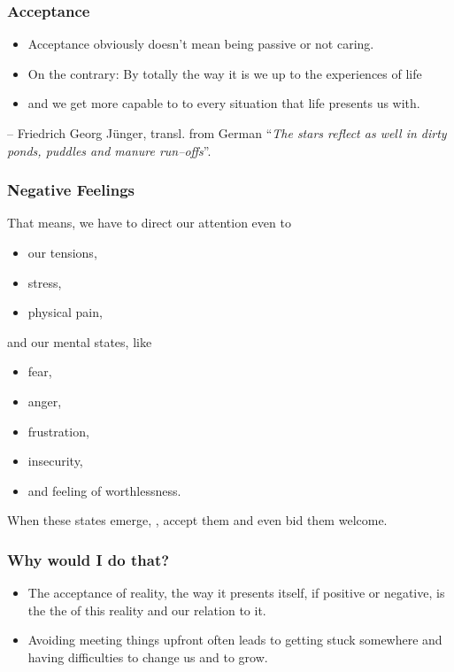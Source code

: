 \begin{frame}
\frametitle{Acceptance}
\begin{itemize}
\item Acceptance obviously doesn’t mean being passive or not caring.
\item On the contrary: By  totally the way it is we  up to the experiences of life   
\item and we get more capable to  to every situation that life presents us with.
\end{itemize}
\begin{block}{-- Friedrich Georg J\"unger, transl. from German}
``\textit{The stars reflect as well in dirty ponds, puddles and manure run--offs}''.
\end{block}
\end{frame}
\begin{frame}
\frametitle{Negative Feelings}
That means, we have to direct our attention even to 
\begin{itemize}
\item our tensions,
\item stress,
\item physical pain,
\end{itemize}
and our mental states, like
\begin{itemize}
\item fear,
\item anger,
\item frustration, 
\item insecurity,
\item and feeling of worthlessness.
\end{itemize}
When these states emerge, , accept them and even bid them welcome.
\end{frame}
\begin{frame}
\frametitle{Why would I do that?}
\begin{itemize}
\item The acceptance of reality, the way it presents itself, if positive or negative, is the the  of this reality and our relation to it.
\item Avoiding meeting things upfront often leads to getting stuck somewhere and having difficulties to change us and to grow.
\end{itemize}
\end{frame}
